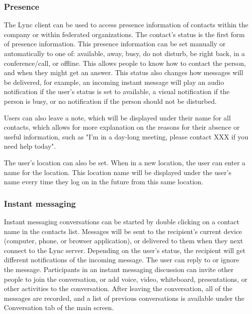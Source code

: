 
\subsubsection{Presence}
The Lync client can be used to access presence information of contacts within the company or within federated organizations. The contact's status is the first form of presence information. This presence information can be set manually or automatically to one of: available, away, busy, do not disturb, be right back, in a conference/call, or offline. This allows people to know how to contact the person, and when they might get an answer. This status also changes how messages will be delivered, for example, an incoming instant message will play an audio notification if the user's status is set to available, a visual notification if the person is busy, or no notification if the person should not be disturbed.

Users can also leave a note, which will be displayed under their name for all contacts, which allows for more explanation on the reasons for their absence or useful information, such as "I'm in a day-long meeting, please contact XXX if you need help today".

The user's location can also be set. When in a new location, the user can enter a name for the location. This location name will be displayed under the user's name every time they log on in the future from this same location\cite[Ch. 1.1]{winters_mastering_2012}.


\subsubsection{Instant messaging}
Instant messaging conversations can be started by double clicking on a contact name in the contacts list. Messages will be sent to the recipient's current device (computer, phone, or browser application), or delivered to them when they next connect to the Lync server. Depending on the user's  status, the recipient will get different notifications of the incoming message. The user can reply to or ignore the message. Participants in an instant messaging discussion can invite other people to join the conversation, or add voice, video, whiteboard, presentations, or other activities to the conversation. After leaving the conversation, all of the messages are recorded, and a list of previous conversations is available under the Conversation tab of the main screen.

